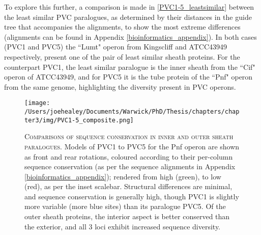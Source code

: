 To explore this further, a comparison is made in \vref{PVC1-5_leastsimilar} between the least similar PVC paralogues, as determined by their distances in the guide tree that accompanies the alignments, to show the most extreme differences (alignments can be found in Appendix \vref{bioinformatics_appendix}). In both cases (PVC1 and PVC5) the ``Lumt" operon from \Pasy{} Kingscliff and ATCC43949 respectively, present one of the pair of least similar sheath proteins. For the counterpart PVC1, the least similar paralogue is the inner sheath from the ``Cif" operon of \Pasy{} ATCC43949, and for PVC5 it is the tube protein of the ``Pnf" operon from the same genome, highlighting the diversity present in PVC operons.

\begin{landscape}
\begin{figure}[p]
 \centering
 \texttt{[image: /Users/joehealey/Documents/Warwick/PhD/Thesis/chapters/chapter3/img/PVC1-5\_composite.png]}
 \captionsetup{singlelinecheck=off, justification=justified, font=footnotesize, aboveskip=10pt}
 \caption[PVC1 to PVC5 paralogue conservation comparison]{\textsc{\normalsize Comparisons of sequence conservation in inner and outer sheath paralogues.}\vspace{0.1cm} \newline Models of PVC1 to PVC5 for the Pnf operon are shown as front and rear rotations, coloured according to their per-column sequence conservation (as per the sequence alignments in Appendix \ref{bioinformatics_appendix}); rendered from high (green), to low (red), as per the inset scalebar. Structural differences are minimal, and sequence conservation is generally high, though PVC1 is slightly more variable (more blue sites) than its paralogue PVC5. Of the outer sheath proteins, the interior aspect is better conserved than the exterior, and all 3 loci exhibit increased sequence diversity.}
	\label{PVC1-5_conservation}
\end{figure}


\end{landscape}
